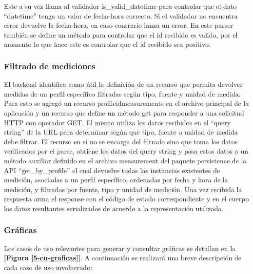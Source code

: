Este a su vez llama al validador is\_valid\_datetime para controlar que el dato ``datetime'' tenga un valor de fecha-hora correcto. Si el validador no encuentra error devuelve la fecha-hora, en caso contrario lanza un error.
En este parser también se define un método para controlar que el id recibido es valido, por el momento lo que hace este es controlar que el id recibido sea positivo.

\subsubsection{Filtrado de mediciones}
El backend identifica como útil la definición de un recurso que permita devolver medidas de un perfil específico filtradas según tipo, fuente y unidad de medida. Para esto se agregó un recurso \/profile\/id\/measurements en el archivo principal de la aplicación y un recurso que define un método get para responder a una solicitud HTTP con operador GET. El mismo utiliza los datos recibidos en el ``query string'' de la URL para determinar según que tipo, fuente o unidad de medida debe filtrar. El recurso en sí no se encarga del filtrado sino que toma los datos verificados por el parse, obtiene los datos del query string y pasa estos datos a un método auxiliar definido en el archivo measurement del paquete persistence de la API ``get\_by\_profile'' el cual devuelve todas las instancias existentes de medición, asociadas a un perfil específico, ordenadas por fecha y hora de la medición, y filtradas por fuente, tipo y unidad de medición. Una vez recibida la respuesta arma el response con el código de estado correspondiente y en el cuerpo los datos resultantes serializados de acuerdo a la representación utilizada.




\subsubsection{Gráficas}

Los casos de uso relevantes para generar y consultar gráficas se detallan en la \textbf{[Figura \ref{5-cu-graficas}]}. A continuación se realizará una breve descripción de cada caso de uso involucrado:

